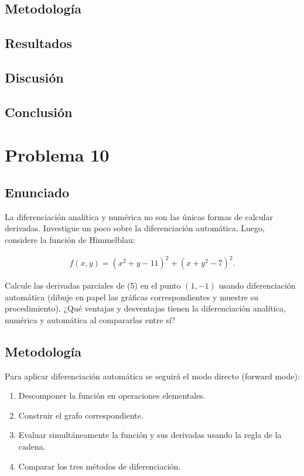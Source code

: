 \documentclass{article}
\begin{document}
\subsection{Metodología}

\subsection{Resultados}
\setcounter{equation}{0}

\subsection{Discusión}

\subsection{Conclusión}

\section{Problema 10}

\subsection{Enunciado}
La diferenciación analítica y numérica no son las únicas formas de calcular derivadas. Investigue un poco sobre la diferenciación automática. Luego, considere la función de Himmelblau:

\begin{align}
    f(x,y) = (x^{2} + y - 11)^{2} + (x + y^{2} - 7)^{2}. \tag{5}
\end{align}

Calcule las derivadas parciales de (5) en el punto $(1,-1)$ usando diferenciación automática (dibuje en papel las gráficas correspondientes y muestre su procedimiento). ¿Qué ventajas y desventajas tienen la diferenciación analítica, numérica y automática al compararlas entre sí?

\subsection{Metodología}

Para aplicar diferenciación automática se seguirá el modo directo (forward mode):
\begin{enumerate}
    \item Descomponer la función en operaciones elementales.
    \item Construir el grafo correspondiente.
    \item Evaluar simultáneamente la función y sus derivadas usando la regla de la cadena.
    \item Comparar los tres métodos de diferenciación.
\end{enumerate}
\end{document}
